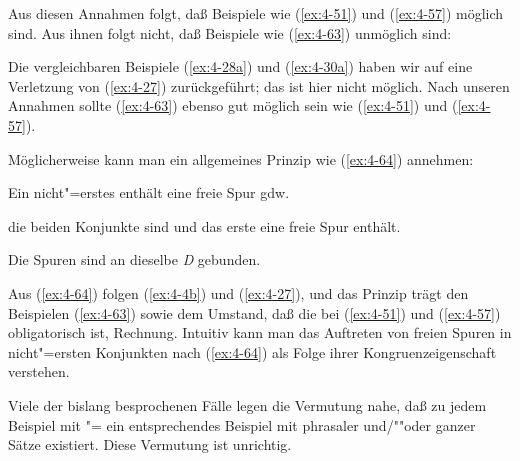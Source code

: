 \documentclass[output=paper]{langsci/langscibook}
\begin{document}
\ssubsection{}%
\label{subsec:4-3-5}
Aus diesen Annahmen folgt, daß Beispiele wie (\ref{ex:4-51}) und (\ref{ex:4-57}) möglich sind. Aus ihnen folgt nicht, daß Beispiele wie (\ref{ex:4-63}) unmöglich sind:

\begin{exe}
\ex
\label{ex:4-63}
\begin{xlist}

\end{xlist}
\end{exe}
Die vergleichbaren Beispiele (\ref{ex:4-28a}) und (\ref{ex:4-30a}) haben wir auf eine Verletzung von (\ref{ex:4-27}) zurückgeführt; das ist hier nicht möglich. Nach unseren Annahmen sollte (\ref{ex:4-63}) ebenso gut möglich sein wie (\ref{ex:4-51}) und (\ref{ex:4-57}).


Möglicherweise kann man ein allgemeines Prinzip wie (\ref{ex:4-64}) annehmen:

\begin{exe}
\ex
\label{ex:4-64}
\begin{xlist}
\ex%
\label{ex:4-64a}
Ein nicht"=erstes  enthält eine freie Spur gdw.
\begin{xlisti}
\ex die beiden Konjunkte  sind und
\ex das erste  eine freie Spur enthält.
\end{xlisti}
\ex%
\label{ex:4-64b}
Die Spuren sind an dieselbe  \textit{D} gebunden.
\end{xlist}
\end{exe}
Aus (\ref{ex:4-64}) folgen (\ref{ex:4-4b}) und (\ref{ex:4-27}), und das Prinzip trägt den Beispielen (\ref{ex:4-63}) sowie dem Umstand, daß die  bei (\ref{ex:4-51}) und (\ref{ex:4-57}) obligatorisch ist, Rechnung. Intuitiv kann man das Auftreten von freien Spuren in nicht"=ersten Konjunkten nach (\ref{ex:4-64}) als Folge ihrer Kongruenzeigenschaft verstehen.

\ssubsection{}%
\label{subsec:4-3-6}
Viele der bislang besprochenen Fälle legen die Vermutung nahe, daß zu jedem Beispiel mit "= ein entsprechendes Beispiel mit phrasaler  und/""oder  ganzer Sätze existiert. Diese Vermutung ist unrichtig.
\end{document}
